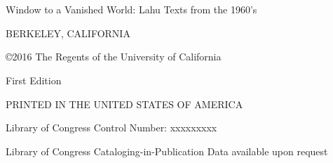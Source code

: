 \chapter*{}
\vspace{15em}
\thispagestyle{empty}
\begin{center}
Window to a Vanished World: Lahu Texts from the 1960’s

BERKELEY, CALIFORNIA

\copyright 2016 The Regents of the University of California

First Edition

PRINTED IN THE UNITED STATES OF AMERICA

Library of Congress Control Number:  xxxxxxxxx

Library of Congress Cataloging-in-Publication Data available upon request

\vspace{10em}
\date{Compiled on \today\ at \currenttime}
\end{center}



